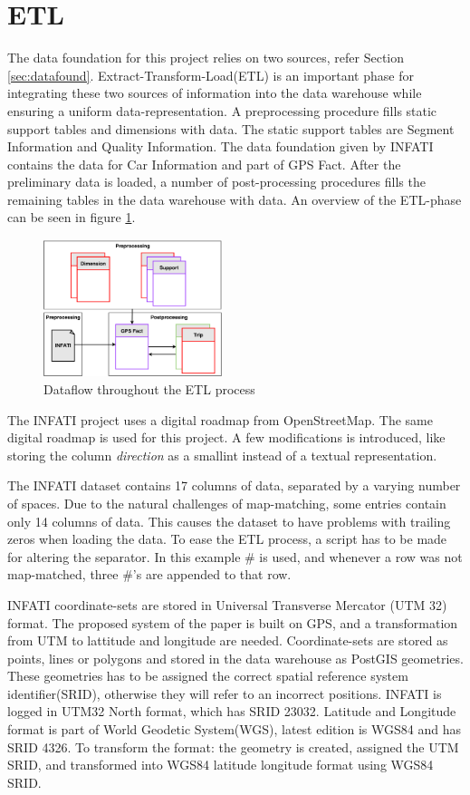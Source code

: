 \section{ETL}\label{sec:ETL}
The data foundation for this project relies on two sources, refer Section \ref{sec:datafound}. Extract-Transform-Load(ETL) is an important phase for integrating these two sources of information into the data warehouse while ensuring a uniform data-representation. A preprocessing procedure fills static support tables and dimensions with data. The static support tables are Segment Information and Quality Information. The data foundation given by INFATI contains the data for Car Information and part of GPS Fact. After the preliminary data is loaded, a number of post-processing procedures fills the remaining tables in the data warehouse with data. An overview of the ETL-phase can be seen in figure \ref{fig:etl}.

\begin{figure}[tb]
\centering
\includegraphics[width=0.465\textwidth]{Pictures/ETL}
\caption{Dataflow throughout the ETL process}
\label{fig:etl}
\end{figure}

The INFATI project\cite{art:INFATI} uses a digital roadmap from OpenStreetMap\cite{osm}. The same digital roadmap is used for this project. A few modifications is introduced, like storing the column \textit{direction} as a smallint instead of a textual representation. 

The INFATI dataset\cite{art:INFATI} contains 17 columns of data, separated by a varying number of spaces. Due to the natural challenges of map-matching, some entries contain only 14 columns of data. This causes the dataset to have problems with trailing zeros when loading the data. To ease the ETL process, a script has to be made for altering the separator. In this example \# is used, and whenever a row was not map-matched, three \#'s are appended to that row.

INFATI coordinate-sets are stored in Universal Transverse Mercator (UTM 32) format. The proposed system of the paper is built on GPS, and a transformation from UTM to lattitude and longitude are needed. Coordinate-sets are stored as points, lines or polygons and stored in the data warehouse as PostGIS\cite{postgis} geometries. These geometries has to be assigned the correct spatial reference system identifier(SRID), otherwise they will refer to an incorrect positions. INFATI is logged in UTM32 North format, which has SRID 23032\cite{UTM32N}. Latitude and Longitude format is part of World Geodetic System(WGS), latest edition is WGS84 and has SRID 4326\cite{WGS84}. To transform the format: the geometry is created, assigned the UTM SRID, and transformed into WGS84 latitude longitude format using WGS84 SRID. 

